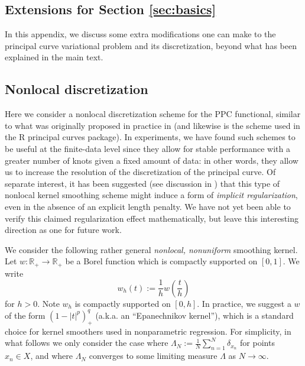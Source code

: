 \documentclass[aos, preprint]{imsart}
\theoremstyle{plain}
\theoremstyle{remark}
\begin{document}
\begin{appendix}
\section{\texorpdfstring{Extensions for Section \ref{sec:basics}}{Extensions for Section 2}}
\label{appn:practical_model}
\label{sec:extensions}

In this appendix, we discuss some extra modifications one can make to the principal curve variational problem and its discretization, beyond what has been explained in the main text.

\subsection{Nonlocal discretization}

Here we consider a nonlocal discretization scheme for the $\textrm{PPC}$ functional,
similar to what was originally proposed in practice in \cite{hastie1989} (and likewise is the scheme used in the R principal
curves package). In experiments, we have found such schemes to be useful at the finite-data level since they allow for stable performance with a greater number of knots given a fixed amount of data: in other words, they allow us to increase the resolution of the discretization of the principal curve. Of separate interest, it has been suggested (see discussion in \cite{hastie1989}) that this type of nonlocal kernel smoothing scheme might induce a form of \emph{implicit regularization}, even in the absence of an explicit length penalty. We have not yet been able to verify this claimed regularization effect mathematically, but leave this interesting direction as one for future work.

We consider the following rather general \emph{nonlocal, nonuniform}
smoothing kernel. Let $w:\mathbb{R}_{+}\rightarrow\mathbb{R}_{+}$
be a Borel function which is compactly supported on $[0,1]$. We write
\[
w_{h}(t):=\frac{1}{h}w\left(\frac{t}{h}\right)
\]
for $h>0$. Note $w_{h}$ is compactly supported on $[0,h]$. In practice,
we suggest a $w$ of the form   $(1-|t|^{p})_+^{q}$   (a.k.a. an
``Epanechnikov kernel''), which is a standard
choice for kernel smoothers used in nonparametric regression.  For simplicity, in what follows we only consider the case
where $\Lambda_{N}:=\frac{1}{N}\sum_{n=1}^{N}\delta_{x_{n}}$ for
points $x_{n}\in X$, and where $\Lambda_{N}$ converges to some limiting
measure $\Lambda$ as $N\rightarrow\infty$.


\end{appendix}
\end{document}
